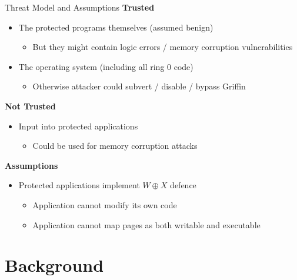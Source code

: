 \documentclass[12pt, dvipsnames, aspectratio=169]{beamer}
\newcommand{\orange}[1]{{\color{orange}#1}}
\newcommand{\blue}[1]{{\color{blue}#1}}
\begin{document}
\begin{frame}[c]{Threat Model and Assumptions}{}
  {\bf \color{blue} Trusted}
  \begin{itemize}
    \item The protected programs themselves (assumed benign)
    \begin{itemize}
      \item But they might contain logic errors / memory corruption vulnerabilities
    \end{itemize}
    \item The operating system (including \blue{all ring 0 code})
    \begin{itemize}
      \item Otherwise attacker could subvert / disable / bypass Griffin
    \end{itemize}
  \end{itemize}

  \vfill
  {\bf \color{orange} Not Trusted}
  \begin{itemize}
    \item Input into protected applications
    \begin{itemize}
      \item Could be used for \orange{memory corruption attacks}
    \end{itemize}
  \end{itemize}

  \vfill
  {\bf \color{green} Assumptions}
  \begin{itemize}
    \item Protected applications implement $W\oplus X$ defence
    \begin{itemize}
      \item Application cannot modify its own code
      \item Application cannot map pages as both writable and executable
    \end{itemize}
  \end{itemize}
\end{frame}

\section{Background}
\end{document}

